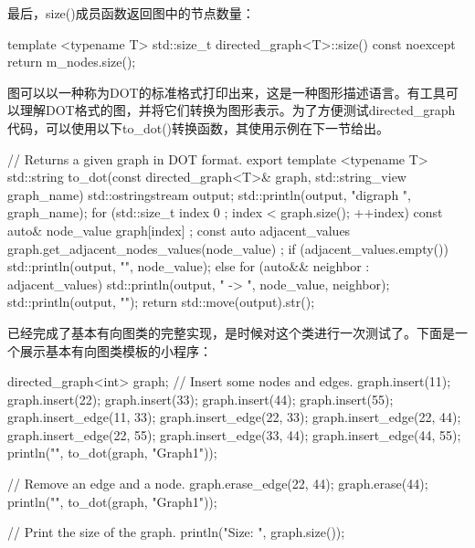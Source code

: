 
最后，size()成员函数返回图中的节点数量：

\begin{cpp}
template <typename T>
std::size_t directed_graph<T>::size() const noexcept
{
    return m_nodes.size();
}
\end{cpp}


图可以以一种称为DOT的标准格式打印出来，这是一种图形描述语言。有工具可以理解DOT格式的图，并将它们转换为图形表示。为了方便测试directed\_graph代码，可以使用以下to\_dot()转换函数，其使用示例在下一节给出。

\begin{cpp}
// Returns a given graph in DOT format.
export template <typename T>
std::string to_dot(const directed_graph<T>& graph, std::string_view graph_name)
{
    std::ostringstream output;
    std::println(output, "digraph {} {{", graph_name);
            for (std::size_t index { 0 }; index < graph.size(); ++index) {
                const auto& node_value { graph[index] };
                const auto adjacent_values { graph.get_adjacent_nodes_values(node_value) };
                if (adjacent_values.empty()) {
                    std::println(output, "{}", node_value);
                } else {
                    for (auto&& neighbor : adjacent_values) {
                        std::println(output, "{} -> {}", node_value, neighbor);
                    }
                }
            }
            std::println(output, "}}");
    return std::move(output).str();
}
\end{cpp}


已经完成了基本有向图类的完整实现，是时候对这个类进行一次测试了。下面是一个展示基本有向图类模板的小程序：

\begin{cpp}
directed_graph<int> graph;
// Insert some nodes and edges.
graph.insert(11);
graph.insert(22);
graph.insert(33);
graph.insert(44);
graph.insert(55);
graph.insert_edge(11, 33);
graph.insert_edge(22, 33);
graph.insert_edge(22, 44);
graph.insert_edge(22, 55);
graph.insert_edge(33, 44);
graph.insert_edge(44, 55);
println("{}", to_dot(graph, "Graph1"));

// Remove an edge and a node.
graph.erase_edge(22, 44);
graph.erase(44);
println("{}", to_dot(graph, "Graph1"));

// Print the size of the graph.
println("Size: {}", graph.size());
\end{cpp}

